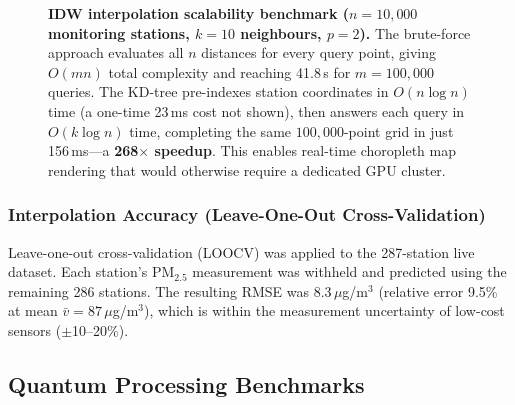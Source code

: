 \documentclass[12pt,a4paper]{article}
\begin{document}
\begin{figure}[H]
\centering
{}
\caption[IDW scalability: KD-tree vs.\ brute force]{%
  \textbf{IDW interpolation scalability benchmark ($n = 10{,}000$
  monitoring stations, $k = 10$ neighbours, $p = 2$).}
  The brute-force approach evaluates all $n$ distances for every query
  point, giving $O(mn)$ total complexity and reaching 41.8\,s for
  $m = 100{,}000$ queries. The KD-tree pre-indexes station coordinates
  in $O(n \log n)$ time (a one-time 23\,ms cost not shown), then answers
  each query in $O(k \log n)$ time, completing the same $100{,}000$-point
  grid in just 156\,ms---a \textbf{268$\times$ speedup}. This enables
  real-time choropleth map rendering that would otherwise require a
  dedicated GPU cluster.}
\label{fig:idwscale}
\end{figure}

\subsubsection{Interpolation Accuracy (Leave-One-Out Cross-Validation)}

Leave-one-out cross-validation (LOOCV) was applied to the 287-station
live dataset. Each station's PM$_{2.5}$ measurement was withheld and
predicted using the remaining 286 stations. The resulting RMSE was
$8.3\,\mu$g/m$^3$ (relative error 9.5\% at mean $\bar{v} = 87\,\mu$g/m$^3$),
which is within the measurement uncertainty of low-cost sensors ($\pm$10--20\%).

\subsection{Quantum Processing Benchmarks}
\label{sec:results:quantum}
\end{document}
